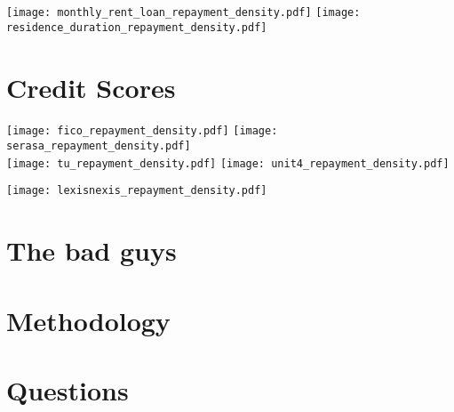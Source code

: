\documentclass[a4paper, landscape]{article}
\begin{document}
\texttt{[image: monthly\_rent\_loan\_repayment\_density.pdf]}
\texttt{[image: residence\_duration\_repayment\_density.pdf]}

\newpage
\section*{Credit Scores}
\texttt{[image: fico\_repayment\_density.pdf]}
\texttt{[image: serasa\_repayment\_density.pdf]} \\
\texttt{[image: tu\_repayment\_density.pdf]}
\texttt{[image: unit4\_repayment\_density.pdf]}

\begin{center}
\texttt{[image: lexisnexis\_repayment\_density.pdf]}
\end{center}


\section*{The bad guys}


\newpage

\section*{Methodology}

\begin{center}

\end{center}

\section*{Questions}
\end{document}
